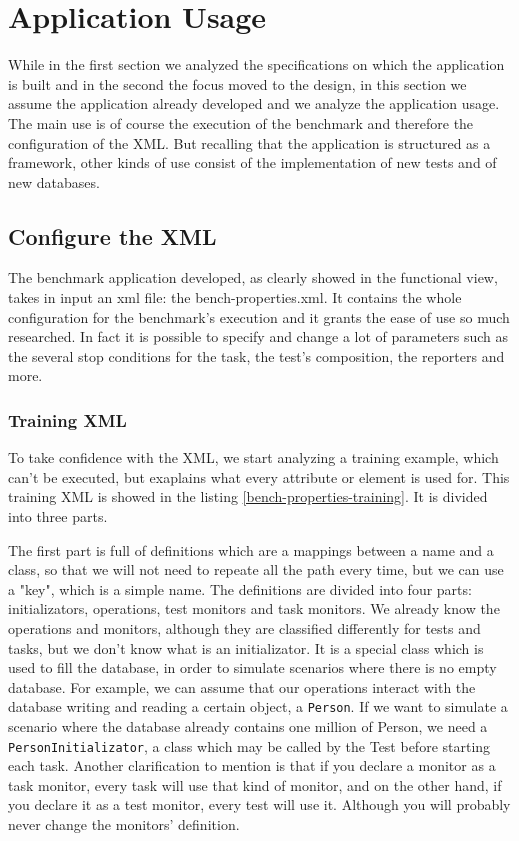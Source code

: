	\section{Application Usage}
While in the first section we analyzed the specifications on which the application is built and in the second the focus moved to the design, in this section we assume the application already developed and we analyze the application usage. The main use is of course the execution of the benchmark and therefore the configuration of the XML. But recalling that the application is structured as a framework, other kinds of use consist of the implementation of new tests and of new databases.

		\subsection{Configure the XML}
The benchmark application developed, as clearly showed in the functional view, takes in input an xml file: the bench-properties.xml. It contains the whole configuration for the benchmark's execution and it grants the ease of use so much researched. In fact it is possible to specify and change a lot of parameters such as the several stop conditions for the task, the test's composition, the reporters and more.

			\subsubsection{Training XML}
To take confidence with the XML, we start analyzing a training example, which can't be executed, but exaplains what every attribute or element is used for. This training XML is showed in the listing \ref{bench-properties-training}. It is divided into three parts.

The first part is full of definitions which are a mappings between a name and a class, so that we will not need to repeate all the path every time, but we can use a "key", which is a simple name. The definitions are divided into four parts: initializators, operations, test monitors and task monitors. We already know the operations and monitors, although they are classified differently for tests and tasks, but we don't know what is an initializator. It is a special class which is used to fill the database, in order to simulate scenarios where there is no empty database. For example, we can assume that our operations interact with the database writing and reading a certain object, a \lstinline!Person!. If we want to simulate a scenario where the database already contains one million of Person, we need a \lstinline!PersonInitializator!, a class which may be called by the Test before starting each task. Another clarification to mention is that if you declare a monitor as a task monitor, every task will use that kind of monitor, and on the other hand, if you declare it as a test monitor, every test will use it. Although you will probably never change the monitors' definition.

